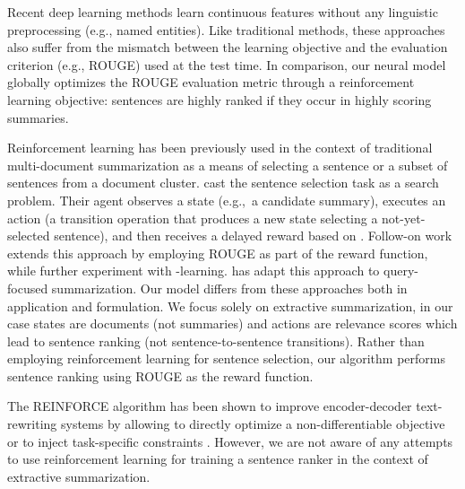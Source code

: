 \documentclass[11pt,a4paper]{article}
\begin{document}
Recent deep learning methods
\cite{krageback-cvsc14,Yin-ijcai15,jp-acl16,nallapati17} learn
continuous features without any linguistic preprocessing (e.g., named
entities). Like traditional methods, these approaches also suffer from
the mismatch between the learning objective and the evaluation
criterion (e.g., ROUGE) used at the test time.  In comparison, our
neural model globally optimizes the ROUGE evaluation metric through a
reinforcement learning objective: sentences are highly ranked if they
occur in highly scoring summaries.




Reinforcement learning has been previously used in the context of
traditional multi-document summarization as a means of selecting a
sentence or a subset of sentences from a document
cluster.  cast the sentence selection task as a
search problem. Their agent observes a state (e.g.,~a candidate
summary), executes an action (a transition operation that produces a
new state selecting a not-yet-selected sentence), and then receives a
delayed reward based on . Follow-on work
\cite{Rioux:emnlp14} extends this approach by employing ROUGE as part
of the reward function, while  further experiment
with \mbox{-learning}.  has adapt
this approach to query-focused summarization. Our model differs from
these approaches both in application and formulation. We focus solely
on extractive summarization, in our case states are documents (not
summaries) and actions are relevance scores which lead to sentence
ranking (not sentence-to-sentence transitions). Rather than employing
reinforcement learning for sentence selection, our algorithm performs
sentence ranking using ROUGE as the reward function.





The REINFORCE algorithm \cite{Williams:1992} has been shown to improve
encoder-decoder text-rewriting systems by allowing to directly
optimize a non-differentiable objective
\cite{ranzato-arxiv15-bias,li-emnlp-16,paulus-socher-arxiv17} or to
inject task-specific constraints
\cite{xingxing-arxiv-17,nogueira-cho:2017:EMNLP2017}. However, we are
not aware of any attempts to use reinforcement learning for training a
sentence ranker in the context of extractive summarization. 
\end{document}
